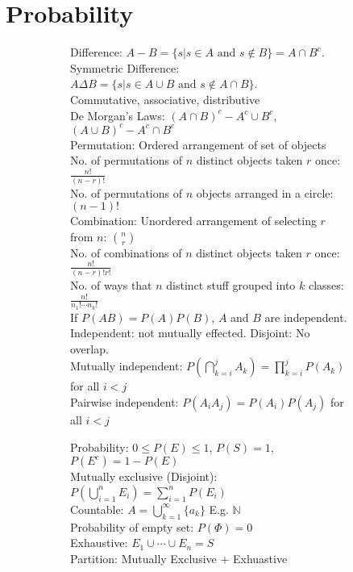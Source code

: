 \documentclass{article}
\begin{document}
\section{Probability}
\begin{figure}[h!]
    \begin{subfigure}[h!]{0.49\textwidth}
        Difference: $A-B=\{s\vert s\in A\text{ and }s\not\in B\}=A\cap B^{c}$.\\
        Symmetric Difference: $A\Delta B=\{s\vert s\in A\cup B\text{ and }s\not\in A\cap B\}$.\\
        Commutative, associative, distributive\\
        De Morgan's Laws: $(A\cap B)^{c}-A^{c}\cup B^{c}$, $(A\cup B)^{c}-A^{c}\cap B^{c}$\\
        Permutation: Ordered arrangement of set of objects\\
        No. of permutations of $n$ distinct objects taken $r$ once: $\frac{n!}{(n-r)!}$\\
        No. of permutations of $n$ objects arranged in a circle: $(n-1)!$\\
        Combination: Unordered arrangement of selecting $r$ from $n$: $\binom{n}{r}$\\
        No. of combinations of $n$ distinct objects taken $r$ once: $\frac{n!}{(n-r)!r!}$\\
        No. of ways that $n$ distinct stuff grouped into $k$ classes: $\frac{n!}{n_{1}!\cdots n_{k}!}$\\
        If $P(AB)=P(A)P(B)$, $A$ and $B$ are independent.\\
        Independent: not mutually effected. Disjoint: No overlap.\\
        Mutually independent: $P(\bigcap_{k=i}^{j}A_{k})=\prod_{k=i}^{j}P(A_{k})$ for all $i<j$\\
        Pairwise independent: $P(A_{i}A_{j})=P(A_{i})P(A_{j})$ for all $i<j$
    \end{subfigure}
    \begin{subfigure}[h!]{0.49\textwidth}
        Probability: $0\leq P(E)\leq 1$, $P(S)=1$, $P(E^{c})=1-P(E)$\\
        Mutually exclusive (Disjoint): $P(\bigcup_{i=1}^{n}E_{i})=\sum_{i=1}^{n}P(E_{i})$\\
        Countable: $A=\bigcup_{k=1}^{\infty}\{a_{k}\}$ E.g. $\mathbb{N}$\\
        Probability of empty set: $P(\Phi)=0$\\
        Exhaustive: $E_{1}\cup\cdots\cup E_{n}=S$\\
        Partition: Mutually Exclusive $+$ Exhuastive
        

\end{subfigure}
\end{figure}
\end{document}
